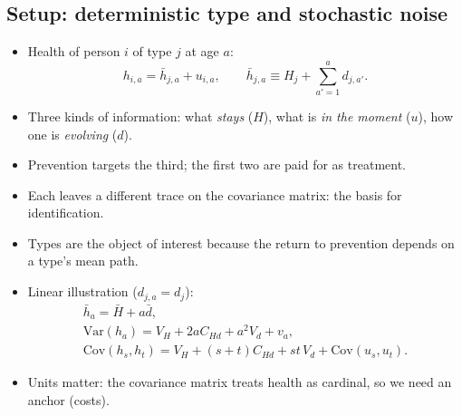 \documentclass[11pt]{article}
\newcommand{\Var}{\mathrm{Var}}
\newcommand{\Cov}{\mathrm{Cov}}
\begin{document}
\subsection{Setup: deterministic type and stochastic noise}
\begin{itemize}
	\item Health of person $i$ of type $j$ at age $a$:
	\begin{equation}
		h_{i,a} = \bar h_{j,a} + u_{i,a}, \qquad \bar h_{j,a} \equiv H_j + \sum_{a'=1}^{a} d_{j,a'} .
		\label{eq:levels}
	\end{equation}
	\item Three kinds of information: what \emph{stays} ($H$), what is \emph{in the moment} ($u$), how one is \emph{evolving} ($d$). \item Prevention targets the third; the first two are paid for as treatment.
	\item Each leaves a different trace on the covariance matrix: the basis for identification.
	\item Types are the object of interest because the return to prevention depends on a type's mean path.
	\item Linear illustration ($d_{j,a}=d_j$):
	\begin{equation}
		\begin{gathered}
			\bar h_a=\bar H+a\bar d,
			\\
			\Var(h_a)=V_H+2aC_{Hd}+a^2V_d+v_a,
			\\
			\Cov(h_s,h_t)=V_H+(s+t)C_{Hd}+st\,V_d+\Cov(u_s,u_t).
		\end{gathered}
		\label{eq:linear}
	\end{equation}
	\item Units matter: the covariance matrix treats health as cardinal, so we need an anchor (costs).
\end{itemize}
\end{document}
